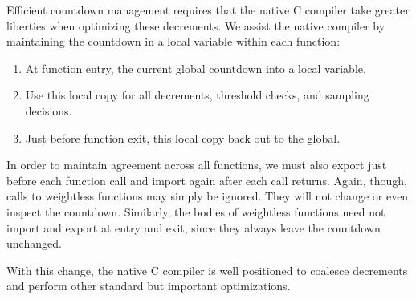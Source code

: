 Efficient countdown management requires that the native C compiler
take greater liberties when optimizing these decrements.  We assist
the native compiler by maintaining the countdown in a local variable
within each function:

\begin{enumerate}
\item At function entry,  the current global countdown
  into a local variable.
\item Use this local copy for all decrements, threshold checks, and
  sampling decisions.
\item Just before function exit,  this local copy back
  out to the global.
\end{enumerate}

In order to maintain agreement across all functions, we must also
export just before each function call and import again after each call
returns.  Again, though, calls to weightless functions may simply be
ignored.  They will not change or even inspect the countdown.
Similarly, the bodies of weightless functions need not import and
export at entry and exit, since they always leave the countdown
unchanged.

With this change, the native C compiler is well positioned to coalesce
decrements and perform other standard but important optimizations.


